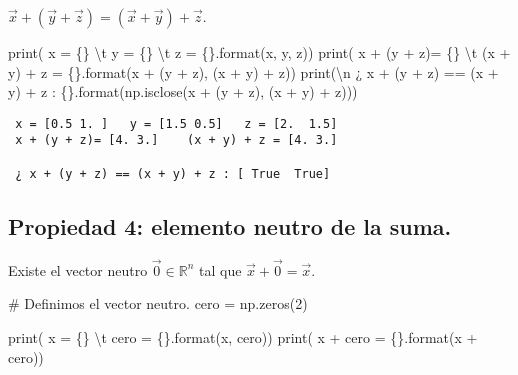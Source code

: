 \documentclass[
  letterpaper,
  DIV=11,
  numbers=noendperiod]{scrreprt}
\newenvironment{Shaded}{\begin{snugshade}}{\end{snugshade}}
\newcommand{\BuiltInTok}[1]{\textcolor[rgb]{0.00,0.23,0.31}{#1}}
\newcommand{\CharTok}[1]{\textcolor[rgb]{0.13,0.47,0.30}{#1}}
\newcommand{\CommentTok}[1]{\textcolor[rgb]{0.37,0.37,0.37}{#1}}
\newcommand{\DecValTok}[1]{\textcolor[rgb]{0.68,0.00,0.00}{#1}}
\newcommand{\NormalTok}[1]{\textcolor[rgb]{0.00,0.23,0.31}{#1}}
\newcommand{\OperatorTok}[1]{\textcolor[rgb]{0.37,0.37,0.37}{#1}}
\newcommand{\SpecialCharTok}[1]{\textcolor[rgb]{0.37,0.37,0.37}{#1}}
\newcommand{\StringTok}[1]{\textcolor[rgb]{0.13,0.47,0.30}{#1}}
\begin{document}
\(\vec{x} + (\vec{y} + \vec{z})= (\vec{x} + \vec{y}) + \vec{z}\).

\begin{Shaded}
\begin{Highlighting}[]
\BuiltInTok{print}\NormalTok{(}\StringTok{\textquotesingle{} x = }\SpecialCharTok{\{\}}\StringTok{ }\CharTok{\textbackslash{}t}\StringTok{ y = }\SpecialCharTok{\{\}}\StringTok{ }\CharTok{\textbackslash{}t}\StringTok{ z = }\SpecialCharTok{\{\}}\StringTok{\textquotesingle{}}\NormalTok{.}\BuiltInTok{format}\NormalTok{(x, y, z))}
\BuiltInTok{print}\NormalTok{(}\StringTok{\textquotesingle{} x + (y + z)= }\SpecialCharTok{\{\}}\StringTok{ }\CharTok{\textbackslash{}t}\StringTok{ (x + y) + z = }\SpecialCharTok{\{\}}\StringTok{\textquotesingle{}}\NormalTok{.}\BuiltInTok{format}\NormalTok{(x }\OperatorTok{+}\NormalTok{ (y }\OperatorTok{+}\NormalTok{ z), (x }\OperatorTok{+}\NormalTok{ y) }\OperatorTok{+}\NormalTok{ z))}
\BuiltInTok{print}\NormalTok{(}\StringTok{\textquotesingle{}}\CharTok{\textbackslash{}n}\StringTok{ ¿ x + (y + z) == (x + y) + z : }\SpecialCharTok{\{\}}\StringTok{\textquotesingle{}}\NormalTok{.}\BuiltInTok{format}\NormalTok{(np.isclose(x }\OperatorTok{+}\NormalTok{ (y }\OperatorTok{+}\NormalTok{ z), (x }\OperatorTok{+}\NormalTok{ y) }\OperatorTok{+}\NormalTok{ z)))}
\end{Highlighting}
\end{Shaded}

\begin{verbatim}
 x = [0.5 1. ]   y = [1.5 0.5]   z = [2.  1.5]
 x + (y + z)= [4. 3.]    (x + y) + z = [4. 3.]

 ¿ x + (y + z) == (x + y) + z : [ True  True]
\end{verbatim}

\subsection{Propiedad 4: elemento neutro de la
suma.}\label{propiedad-4-elemento-neutro-de-la-suma.}

Existe el vector neutro \(\vec{0} \in \mathbb{R}^n\) tal que
\(\vec{x} + \vec{0} = \vec{x}\).

\begin{Shaded}
\begin{Highlighting}[]
\CommentTok{\# Definimos el vector neutro.}
\NormalTok{cero }\OperatorTok{=}\NormalTok{ np.zeros(}\DecValTok{2}\NormalTok{)}

\BuiltInTok{print}\NormalTok{(}\StringTok{\textquotesingle{} x = }\SpecialCharTok{\{\}}\StringTok{ }\CharTok{\textbackslash{}t}\StringTok{ cero = }\SpecialCharTok{\{\}}\StringTok{\textquotesingle{}}\NormalTok{.}\BuiltInTok{format}\NormalTok{(x, cero))}
\BuiltInTok{print}\NormalTok{(}\StringTok{\textquotesingle{} x + cero = }\SpecialCharTok{\{\}}\StringTok{\textquotesingle{}}\NormalTok{.}\BuiltInTok{format}\NormalTok{(x }\OperatorTok{+}\NormalTok{ cero))}
\end{Highlighting}
\end{Shaded}
\end{document}
